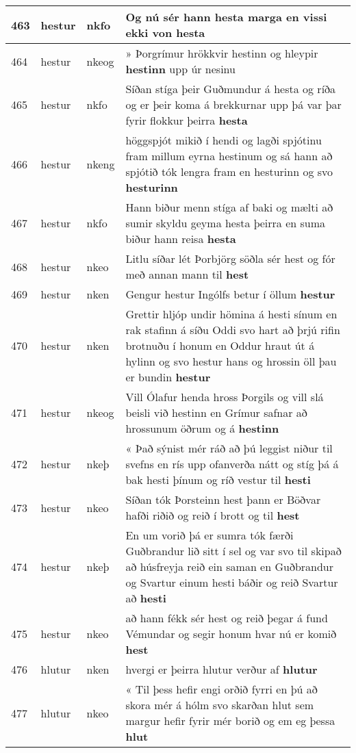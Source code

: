 \documentclass{article}
\begin{document}
\begin{longtable}{p{1cm}|p{1cm}|p{1cm}|p{13cm}}
\hline
463&hestur&nkfo&Og nú sér hann hesta marga en vissi ekki von \textbf{hesta} \\
\hline
464&hestur&nkeog&» Þorgrímur hrökkvir hestinn og hleypir \textbf{hestinn} upp úr nesinu\\
\hline
465&hestur&nkfo&Síðan stíga þeir Guðmundur á hesta og ríða og er þeir koma á brekkurnar upp þá var þar fyrir flokkur þeirra \textbf{hesta} \\
\hline
466&hestur&nkeng&höggspjót mikið í hendi og lagði spjótinu fram millum eyrna hestinum og sá hann að spjótið tók lengra fram en hesturinn og svo \textbf{hesturinn} \\
\hline
467&hestur&nkfo&Hann biður menn stíga af baki og mælti að sumir skyldu geyma hesta þeirra en suma biður hann reisa \textbf{hesta} \\
\hline
468&hestur&nkeo&Litlu síðar lét Þorbjörg söðla sér hest og fór með annan mann til \textbf{hest} \\
\hline
469&hestur&nken&Gengur hestur Ingólfs betur í öllum \textbf{hestur} \\
\hline
470&hestur&nken&Grettir hljóp undir hömina á hesti sínum en rak stafinn á síðu Oddi svo hart að þrjú rifin brotnuðu í honum en Oddur hraut út á hylinn og svo hestur hans og hrossin öll þau er bundin \textbf{hestur} \\
\hline
471&hestur&nkeog&Vill Ólafur henda hross Þorgils og vill slá beisli við hestinn en Grímur safnar að hrossunum öðrum og á \textbf{hestinn} \\
\hline
472&hestur&nkeþ&« Það sýnist mér ráð að þú leggist niður til svefns en rís upp ofanverða nátt og stíg þá á bak hesti þínum og ríð vestur til \textbf{hesti} \\
\hline
473&hestur&nkeo&Síðan tók Þorsteinn hest þann er Böðvar hafði riðið og reið í brott og til \textbf{hest} \\
\hline
474&hestur&nkeþ&En um vorið þá er sumra tók færði Guðbrandur lið sitt í sel og var svo til skipað að húsfreyja reið ein saman en Guðbrandur og Svartur einum hesti báðir og reið Svartur að \textbf{hesti} \\
\hline
475&hestur&nkeo&að hann fékk sér hest og reið þegar á fund Vémundar og segir honum hvar nú er komið \textbf{hest} \\
\hline
476&hlutur&nken&hvergi er þeirra hlutur verður af \textbf{hlutur} \\
\hline
477&hlutur&nkeo&« Til þess hefir engi orðið fyrri en þú að skora mér á hólm svo skarðan hlut sem margur hefir fyrir mér borið og em eg þessa \textbf{hlut} \\

\end{longtable}
\end{document}
